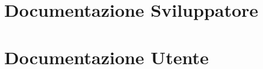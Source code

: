 \renewcommand*{\mypath}{trovaintruso2}%


\graphicspath{ {\mypath/images/} }

\section[Sviluppatore]{Documentazione Sviluppatore}


\section[Utente]{Documentazione Utente}

